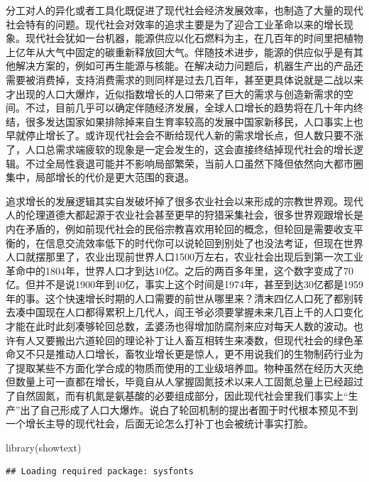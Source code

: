 \documentclass[]{tufte-book}
\newenvironment{Shaded}{}{}
\newcommand{\FunctionTok}[1]{\textcolor[rgb]{0.02,0.16,0.49}{#1}}
\newcommand{\NormalTok}[1]{#1}
\begin{document}
分工对人的异化或者工具化既促进了现代社会经济发展效率，也制造了大量的现代社会特有的问题。现代社会对效率的追求主要是为了迎合工业革命以来的增长现象。现代社会犹如一台机器，能源供应以化石燃料为主，在几百年的时间里把植物上亿年从大气中固定的碳重新释放回大气。伴随技术进步，能源的供应似乎是有其他解决方案的，例如可再生能源与核能。在解决动力问题后，机器生产出的产品还需要被消费掉，支持消费需求的则同样是过去几百年，甚至更具体说就是二战以来才出现的人口大爆炸，近似指数增长的人口带来了巨大的需求与创造新需求的空间。不过，目前几乎可以确定伴随经济发展，全球人口增长的趋势将在几十年内终结，很多发达国家如果排除掉来自生育率较高的发展中国家新移民，人口事实上也早就停止增长了。或许现代社会会不断给现代人新的需求增长点，但人数只要不涨了，人口总需求端疲软的现象是一定会发生的，这会直接终结掉现代社会的增长逻辑。不过全局性衰退可能并不影响局部繁荣，当前人口虽然下降但依然向大都市圈集中，局部增长的代价是更大范围的衰退。

追求增长的发展逻辑其实自发破坏掉了很多农业社会以来形成的宗教世界观。现代人的伦理道德大都起源于农业社会甚至更早的狩猎采集社会，很多世界观跟增长是内在矛盾的，例如前现代社会的民俗宗教喜欢用轮回的概念，但轮回是需要收支平衡的，在信息交流效率低下的时代你可以说轮回到别处了也没法考证，但现在世界人口就摆那里了，农业出现前世界人口1500万左右，农业社会出现后到第一次工业革命中的1804年，世界人口才到达10亿。之后的两百多年里，这个数字变成了70亿。但并不是说1900年到40亿，事实上这个时间是1974年，甚至到达30亿都是1959年的事。这个快速增长时期的人口需要的前世从哪里来？清末四亿人口死了都别转去凑中国现在人口都得累积上几代人，阎王爷必须要掌握未来几百上千的人口变化才能在此时此刻凑够轮回总数，孟婆汤也得增加防腐剂来应对每天人数的波动。也许有人又要搬出六道轮回的理论补丁让人畜互相转生来凑数，但现代社会的绿色革命又不只是推动人口增长，畜牧业增长更是惊人，更不用说我们的生物制药行业为了提取某些不方面化学合成的物质而使用的工业级培养皿。物种虽然在经历大灭绝但数量上可一直都在增长，毕竟自从人掌握固氮技术以来人工固氮总量上已经超过了自然固氮，而有机氮是氨基酸的必要组成部分，因此现代社会里我们事实上``生产''出了自己形成了人口大爆炸。说白了轮回机制的提出者囿于时代根本预见不到一个增长主导的现代社会，后面无论怎么打补丁也会被统计事实打脸。

\begin{Shaded}
\begin{Highlighting}[]
\FunctionTok{library}\NormalTok{(showtext)}
\end{Highlighting}
\end{Shaded}

\begin{verbatim}
## Loading required package: sysfonts
\end{verbatim}
\end{document}

